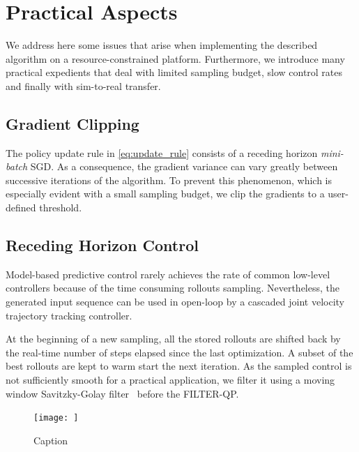 \section{Practical Aspects} \label{sec:practical_aspects}

We address here some issues that arise when implementing the described algorithm on a resource-constrained platform. Furthermore, we introduce many practical expedients that deal with limited sampling budget, slow control rates and finally with sim-to-real transfer.  

\subsection{Gradient Clipping} 
The policy update rule in \eqref{eq:update_rule} consists of a receding horizon \emph{mini-batch} SGD. As a consequence, the gradient variance can vary greatly between successive iterations of the algorithm. To prevent this phenomenon, which is especially evident with a small sampling budget, we clip the gradients to a user-defined threshold.  

\subsection{Receding Horizon Control} 
Model-based predictive control rarely achieves the rate of common low-level controllers because of the time consuming rollouts sampling. Nevertheless, the generated input sequence can be used in open-loop by a cascaded joint velocity trajectory tracking controller. 

At the beginning of a new sampling, all the stored rollouts are shifted back by the real-time number of steps elapsed since the last optimization. A subset of the best rollouts are kept to warm start the next iteration. 
As the sampled control is not sufficiently smooth for a practical application, we filter it using a moving window Savitzky-Golay filter~\cite{gorry1990general} before the FILTER-QP. 

\begin{figure}[t]
    \centering
    \texttt{[image: ]}
    \caption{Caption}
    \label{fig:my_label}
\end{figure}
